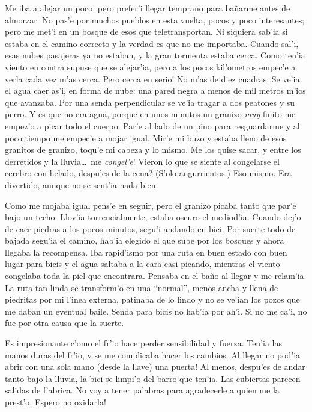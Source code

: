 Me iba a alejar un poco, pero prefer'i llegar temprano para ba\~narme antes de
almorzar. No pas'e por muchos pueblos en esta vuelta, pocos y poco interesantes;
pero me met'i en un bosque de esos que teletransportan. Ni siquiera sab'ia si
estaba en el camino correcto y la verdad es que no me importaba. Cuando sal'i,
esas nubes pasajeras ya no estaban, y la gran tormenta estaba cerca. Como ten'ia
viento en contra supuse que se alejar'ia, pero a los pocos kil'ometros empec'e a
verla cada vez m'as cerca. \textexclamdown Pero cerca en serio! No m'as de diez
cuadras. Se ve'ia el agua caer as'i, en forma de nube: una pared negra a menos
de mil metros m'ios que avanzaba. Por una senda perpendicular se ve'ia tragar a
dos peatones y su perro. Y es que no era agua, porque en unos minutos un granizo
\emph{muy} finito me empez'o a picar todo el cuerpo. Par'e al lado de un pino
para resguardarme y al poco tiempo me empec'e a mojar igual. Mir'e mi buzo y
estaba lleno de esos granitos de granizo, toqu'e mi cabeza y lo mismo. Me los
quise sacar, y entre los derretidos y la lluvia\ldots\ \textexclamdown me
\emph{congel'e}! \textquestiondown Vieron lo que se siente al congelarse el
cerebro con helado, despu'es de la cena? (S'olo angurrientos.) Eso mismo. Era
divertido, aunque no se sent'ia nada bien.

Como me mojaba igual pens'e en seguir, pero el granizo picaba tanto que par'e
bajo un techo. Llov'ia torrencialmente, estaba oscuro el mediod'ia. Cuando dej'o
de caer piedras a los pocos minutos, segu'i andando en bici. Por suerte todo de
bajada segu'ia el camino, hab'ia elegido el que sube por los bosques y ahora
llegaba la recompensa. Iba rapid'ismo por una ruta en buen estado con buen lugar
para bicis y el agua saltaba a la cara casi picando, mientras el viento
congelaba toda la piel que encontrara. Pensaba en el ba\~no al llegar y me
relam'ia. La ruta tan linda se transform'o en una ``normal'', menos ancha y
llena de piedritas por mi l'inea externa, patinaba de lo lindo y no se ve'ian
los pozos que me daban un eventual baile. Senda para bicis no hab'ia por ah'i.
Si no me ca'i, no fue por otra causa que la suerte.

Es impresionante c'omo el fr'io hace perder sensibilidad y fuerza. Ten'ia las
manos duras del fr'io, y se me complicaba hacer los cambios. \textexclamdown Al
llegar no pod'ia abrir con una sola mano (desde la llave) una puerta! Al menos,
despu'es de andar tanto bajo la lluvia, la bici se limpi'o del barro que ten'ia.
Las cubiertas parecen salidas de f'abrica. No voy a tener palabras para
agradecerle a quien me la prest'o. \textexclamdown Espero no oxidarla!

